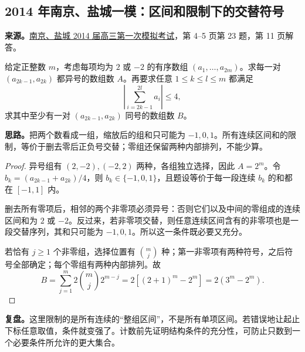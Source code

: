 \documentclass[UTF8]{ctexart}
\begin{document}
\subsection{2014 年南京、盐城一模：区间和限制下的交替符号}\label{sec:c2014ny1}
\textbf{来源。}\href{https://www.51wendang.com/doc/b354a966ae74314766a3ac38}{南京、盐城 2014 届高三第一次模拟考试}，第 4--5 页第 23 题，第 11 页解答。
\begin{example}[题意]
给定正整数 $m$，考虑每项均为 $2$ 或 $-2$ 的有序数组 $(a_1,\ldots,a_{2m})$。求每一对 $(a_{2k-1},a_{2k})$ 都异号的数组数 $A$。再要求任意 $1\leq k\leq l\leq m$ 都满足
\[
\left|\sum_{i=2k-1}^{2l}a_i\right|\leq4,
\]
求其中至少有一对 $(a_{2k-1},a_{2k})$ 同号的数组数 $B$。
\end{example}
\textbf{思路。}把两个数看成一组，缩放后的组和只可能为 $-1,0,1$。所有连续区间和的限制，等价于删去零后正负号交替；零组还保留两种内部排列，不能少算。
\begin{proof}
异号组有 $(2,-2),(-2,2)$ 两种，各组独立选择，因此 $A=2^m$。令 $b_k=(a_{2k-1}+a_{2k})/4$，则 $b_k\in\{-1,0,1\}$，且题设等价于每一段连续 $b_k$ 的和都在 $[-1,1]$ 内。

删去所有零项后，相邻的两个非零项必须异号：否则它们以及中间的零组成的连续区间和为 $2$ 或 $-2$。反过来，若非零项交替，则任意连续区间含有的非零项也是一段交替序列，其和只可能为 $-1,0,1$。所以这一条件既必要又充分。

若恰有 $j\geq1$ 个非零组，选择位置有 $\binom mj$ 种；第一非零项有两种符号，之后符号全部确定；每个零组有两种内部排列。故
\[
B=\sum_{j=1}^{m}2\binom mj2^{m-j}
=2\left[(2+1)^m-2^m\right]
=\boxed{2(3^m-2^m)}.
\]
\end{proof}
\textbf{复盘。}这里限制的是所有连续的“整组区间”，不是所有单项区间。若错误地让起止下标任意取值，条件就变强了。计数前先证明结构条件的充分性，可防止只数到一个必要条件所允许的更大集合。
\end{document}
